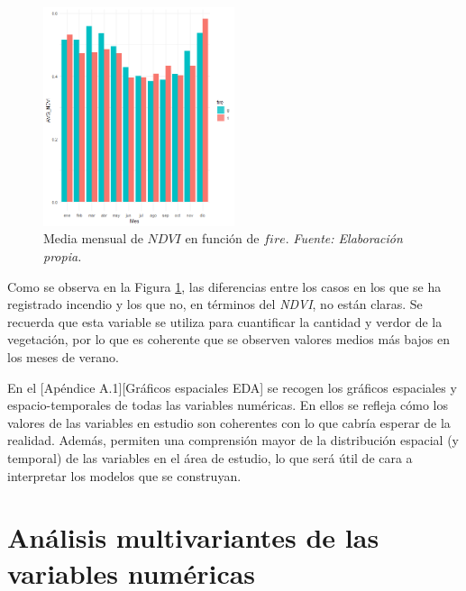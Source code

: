 \documentclass[12pt,a4paper,]{book}
\numberwithin{dummy}{section}
\theoremstyle{ocrenumbox}
\theoremstyle{blacknumex}
\theoremstyle{blacknumbox}
\theoremstyle{ocrenum}
\theoremstyle{ocrenum}
\begin{document}
\begin{figure}[H]
\centering
\includegraphics[width = 0.5\textwidth]{graficos/NDVI_mes.png}
\caption[Media mensual de $NDVI$ en función de $fire$]{Media mensual de $NDVI$ en función de $fire$. \it Fuente: Elaboración propia.}
\label{fig:NDVI_mes}
\end{figure}

Como se observa en la Figura \ref{fig:NDVI_mes}, las diferencias entre
los casos en los que se ha registrado incendio y los que no, en términos
del \emph{NDVI}, no están claras. Se recuerda que esta variable se
utiliza para cuantificar la cantidad y verdor de la vegetación, por lo
que es coherente que se observen valores medios más bajos en los meses
de verano.

En el {[}Apéndice A.1{]}{[}Gráficos espaciales EDA{]} se recogen los
gráficos espaciales y espacio-temporales de todas las variables
numéricas. En ellos se refleja cómo los valores de las variables en
estudio son coherentes con lo que cabría esperar de la realidad. Además,
permiten una comprensión mayor de la distribución espacial (y temporal)
de las variables en el área de estudio, lo que será útil de cara a
interpretar los modelos que se construyan.

\hypertarget{anuxe1lisis-multivariantes-de-las-variables-numuxe9ricas}{%
\section{Análisis multivariantes de las variables
numéricas}\label{anuxe1lisis-multivariantes-de-las-variables-numuxe9ricas}}
\end{document}
